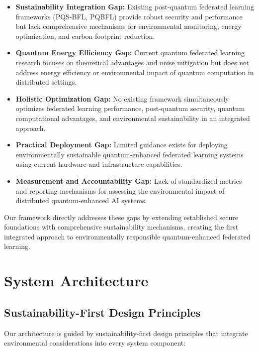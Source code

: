 \documentclass[10pt,journal,compsoc]{IEEEtran}
\begin{document}
\begin{itemize}
\item \textbf{Sustainability Integration Gap:} Existing post-quantum federated learning frameworks (PQS-BFL, PQBFL) provide robust security and performance but lack comprehensive mechanisms for environmental monitoring, energy optimization, and carbon footprint reduction.

\item \textbf{Quantum Energy Efficiency Gap:} Current quantum federated learning research focuses on theoretical advantages and noise mitigation but does not address energy efficiency or environmental impact of quantum computation in distributed settings.

\item \textbf{Holistic Optimization Gap:} No existing framework simultaneously optimizes federated learning performance, post-quantum security, quantum computational advantages, and environmental sustainability in an integrated approach.

\item \textbf{Practical Deployment Gap:} Limited guidance exists for deploying environmentally sustainable quantum-enhanced federated learning systems using current hardware and infrastructure capabilities.

\item \textbf{Measurement and Accountability Gap:} Lack of standardized metrics and reporting mechanisms for assessing the environmental impact of distributed quantum-enhanced AI systems.
\end{itemize}

Our framework directly addresses these gaps by extending established secure foundations with comprehensive sustainability mechanisms, creating the first integrated approach to environmentally responsible quantum-enhanced federated learning.

\section{System Architecture}

\subsection{Sustainability-First Design Principles}

Our architecture is guided by sustainability-first design principles that integrate environmental considerations into every system component:
\end{document}
